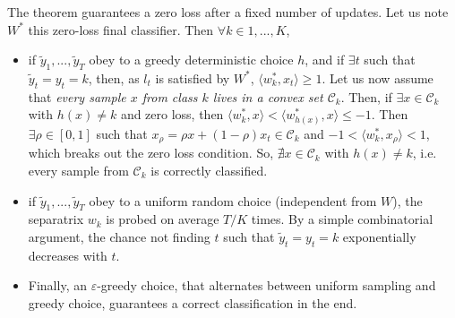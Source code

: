 \documentclass[preprint,12pt,authoryear]{elsarticle}
\begin{document}
The theorem guarantees a zero loss after a fixed number of updates. Let us note  $W^*$ this zero-loss final classifier. Then $\forall k \in 1,...,K$, 



\begin{itemize}
	\item if $\tilde{y}_1, ...,\tilde{y}_T$ obey to a greedy deterministic choice $h$, and if $\exists t$ such that $\tilde{y}_t = y_t = k$, then, as $l_t$ is satisfied by $W^*$, $\langle w_k^*, x_t\rangle \geq 1$. Let us now assume that \emph{every sample $x$ from class $k$ lives in a convex set $\mathcal{C}_k$}. Then, if $\exists x \in \mathcal{C}_k$ with $h(x) \neq k$ and zero loss, then $\langle w_k^*, x\rangle < \langle w_{h(x)}^*, x\rangle \leq -1$. Then $\exists \rho \in [0,1]$ such that $x_\rho = \rho x + (1-\rho) x_t \in \mathcal{C}_k$ and 
	$-1 < \langle w_k^*,x_\rho \rangle < 1 $, which breaks out the zero loss condition. So, $\nexists x \in \mathcal{C}_k$ with $h(x) \neq k$, i.e. every sample from $\mathcal{C}_k$ is correctly classified.
	\item if $\tilde{y}_1, ...,\tilde{y}_T$ obey to a uniform random choice (independent from $W$), the separatrix $w_k$ is probed on average $T/K$ times. By a simple combinatorial argument, the chance not finding $t$ such that $\tilde{y}_t = y_t = k$ exponentially decreases with $t$.
	\item Finally, an $\varepsilon$-greedy choice, that alternates between uniform sampling and greedy choice, guarantees a correct classification in the end.  
\end{itemize}
\end{document}

